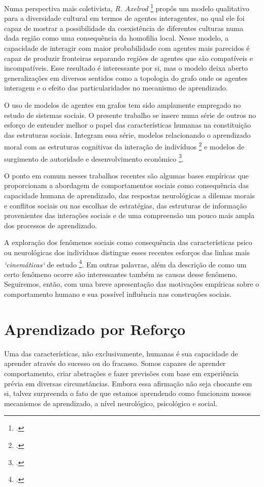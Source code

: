 Numa perspectiva mais coletivista, \emph{R. Axelrod} \footcite{Axelrod1997} propôs um modelo qualitativo para a diversidade cultural em termos de agentes interagentes, no qual ele foi capaz de mostrar a possibilidade da coexistência de diferentes culturas numa dada região como uma consequência da homofilia local.
Nesse modelo, a capacidade de interagir com maior probabilidade com agentes mais parecidos é capaz de produzir fronteiras separando regiões de agentes que são compatíveis e incompatíveis.
Esse resultado é interessante por si, mas o modelo deixa aberto generalizações em diversos sentidos como a topologia do grafo onde os agentes interagem e o efeito das particularidades no mecanismo de aprendizado.

O uso de modelos de agentes em grafos tem sido amplamente empregado no estudo de sistemas sociais.
O presente trabalho se insere numa série de outros no esforço de entender melhor o papel das características humanas na constituição das estruturas sociais.
Integram essa série, modelos relacionando o aprendizado moral com as estruturas cognitivas da interação de indivíduos \footcite{Caticha2011,Vicente2014,Cesar2014} e modelos de surgimento de autoridade e desenvolvimento econômico \footcite{Papa2014,Calsaverini2013}.

O ponto em comum nesses trabalhos recentes são algumas bases empíricas que proporcionam a abordagem de comportamentos sociais como consequência das capacidade humana de aprendizado, das respostas neurológicas a dilemas morais e conflitos sociais ou nas escolhas de estratégias, das estruturas de informação provenientes das interações sociais e de uma compreensão um pouco mais ampla dos processos de aprendizado.

A exploração dos fenômenos sociais como consequência das características psico ou neurológicas dos indivíduos distingue esses recentes esforços das linhas mais \emph{`cinemáticas`} de estudo \footcite{Castellano2009}.
Em outras palavras, além da descrição de como um certo fenômeno ocorre são interessantes também as causas desse fenômeno.
Seguiremos, então, com uma breve apresentação das motivações empíricas sobre o comportamento humano e sua possível influência nas construções sociais.

\section{Aprendizado por Reforço}

Uma das características, não exclusivamente, humanas é sua capacidade de aprender através do sucesso ou do fracasso.
Somos capazes de aprender comportamento, criar abstrações e fazer previsões com base em experiência prévia em diversas circunstâncias.
Embora essa afirmação não seja chocante em si, talvez surpreenda o fato de que estamos aprendendo como funcionam nossos mecanismos de aprendizado, a nível neurológico, psicológico e social.

